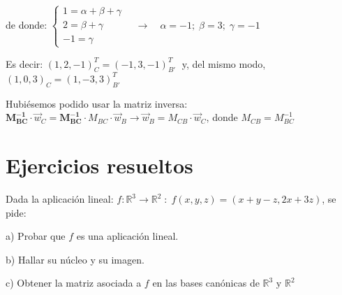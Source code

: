  \textcolor{gris}{de donde: $\begin{cases} 1=\alpha+\beta+\gamma\\2=\beta+\gamma\\-1=\gamma \end{cases} \quad \to \quad \alpha=-1;\; \beta=3; \; \gamma=-1  $ }
 
 \textcolor{gris}{Es decir: $(1,2,-1)^T_C=(-1,3,-1)^T_{B'} \;$ y, del mismo modo, $(1,0,3)_C=(1,-3,3)^T_{B'} $}
 
 \textcolor{gris}{Hubiésemos podido usar la matriz inversa: $\boldsymbol{M^{-1}_{BC}} \cdot \vec w_C = \boldsymbol{M^{-1}_{BC}} \cdot M_{BC}\cdot \vec w_B \to \vec w_B =M_{CB}\cdot \vec w_C$, donde $M_{CB}=M^{-1}_{BC}$} 


\section{Ejercicios resueltos}

\begin{ejre}
Dada la aplicación lineal: $f:\mathbb R^3 \to \mathbb R^2\; : \; f(x,y,z)=(x+y-z,2x+3z)$, se pide:

a)  Probar que $f$ es una aplicación lineal.

b) Hallar su núcleo y su imagen.

c) Obtener la matriz asociada a $f$ en las bases canónicas de $\mathbb R^3 \text{ y } \mathbb R^2$	


\end{ejre}

